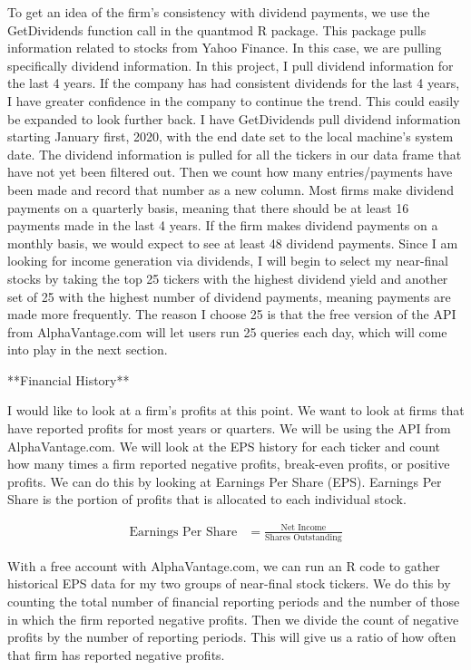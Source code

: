 \documentclass[12pt]{article}
\begin{document}
To get an idea of the firm's consistency with dividend payments, we use the GetDividends function call in the quantmod R package. This package pulls information related to stocks from Yahoo Finance. In this case, we are pulling specifically dividend information. In this project, I pull dividend information for the last 4 years. If the company has had consistent dividends for the last 4 years, I have greater confidence in the company to continue the trend. This could easily be expanded to look further back. I have GetDividends pull dividend information starting January first, 2020, with the end date set to the local machine's system date. The dividend information is pulled for all the tickers in our data frame that have not yet been filtered out. Then we count how many entries/payments have been made and record that number as a new column. Most firms make dividend payments on a quarterly basis, meaning that there should be at least 16 payments made in the last 4 years. If the firm makes dividend payments on a monthly basis, we would expect to see at least 48 dividend payments. Since I am looking for income generation via dividends, I will begin to select my near-final stocks by taking the top 25 tickers with the highest dividend yield and another set of 25 with the highest number of dividend payments, meaning payments are made more frequently. The reason I choose 25 is that the free version of the API from AlphaVantage.com will let users run 25 queries each day, which will come into play in the next section.

**Financial History**

I would like to look at a firm's profits at this point. We want to look at firms that have reported profits for most years or quarters. We will be using the API from AlphaVantage.com. We will look at the EPS history for each ticker and count how many times a firm reported negative profits, break-even profits, or positive profits. We can do this by looking at Earnings Per Share (EPS). Earnings Per Share is the portion of profits that is allocated to each individual stock.

\begin{align*}
\text{Earnings Per Share} &= \frac{\text{Net Income}}{\text{Shares Outstanding}}
\end{align*}

With a free account with AlphaVantage.com, we can run an R code to gather historical EPS data for my two groups of near-final stock tickers. We do this by counting the total number of financial reporting periods and the number of those in which the firm reported negative profits. Then we divide the count of negative profits by the number of reporting periods. This will give us a ratio of how often that firm has reported negative profits.
\end{document}
